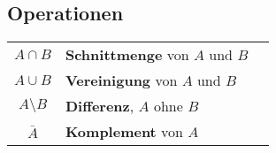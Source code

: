 \subsection{Operationen}

{

	\def\circlea{(0,0) circle (1cm)}
	\def\circleb{(1.5,0cm) circle (1cm)}
	\def\universe{(0,0) circle (1.5cm)}



	\def\vennaandb{\begin{tikzpicture}
			\begin{scope}
				\clip \circlea;
				\fill[filled] \circleb;
			\end{scope}
			\draw[outline] \circlea node {\( A \)};
			\draw[outline] \circleb node {\( B \)};
		\end{tikzpicture}
	}

	\def\vennaorb{
		\begin{tikzpicture}
			\draw[filled] \circlea node {\( A \)}
			\circleb node {\( B \)};
			\draw[outline] \circlea node {\( A \)};
			\draw[outline] \circleb node {\( B \)};
		\end{tikzpicture}
	}

	\def\vennaminusb{
		\begin{tikzpicture}
			\begin{scope}
				\clip \circlea;
				\draw[filled, even odd rule] \circlea node {\( A \)}
				\circleb;
			\end{scope}
			\draw[outline] \circlea node {\( A \)};
			\draw[outline] \circleb node {\( B \)};
		\end{tikzpicture}
	}

	\def\vennnota{
		\begin{tikzpicture}
			\begin{scope}
				\clip \universe;
				\draw[filled, even odd rule, above left] \universe node {} \circlea;
			\end{scope}
			\draw[outline] \circlea node {\( A \)};
		\end{tikzpicture}
	}

	\begin{tabular}{c m{5cm} m{4cm}}
		\( A \cap B \)      & \textbf{Schnittmenge} von \( A \) und \( B \) & \vennaandb{}   \\
		\( A \cup B \)      & \textbf{Vereinigung} von \( A \) und \( B \)  & \vennaorb{}    \\
		\( A \setminus B \) & \textbf{Differenz}, \( A \) ohne \( B \)      & \vennaminusb{} \\
		\(\bar{A}\)         & \textbf{Komplement} von \(A \)                & \vennnota{}
	\end{tabular}

}
